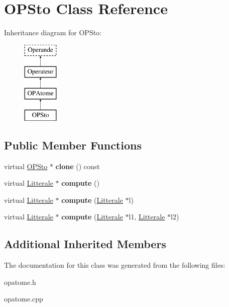 \hypertarget{class_o_p_sto}{}\section{O\+P\+Sto Class Reference}
\label{class_o_p_sto}
Inheritance diagram for O\+P\+Sto\+:\begin{figure}[H]
\begin{center}
\leavevmode
\includegraphics[height=4.000000cm]{class_o_p_sto}
\end{center}
\end{figure}
\subsection*{Public Member Functions}
\begin{DoxyCompactItemize}
\item 
virtual \hyperlink{class_o_p_sto}{O\+P\+Sto} $\ast$ {\bfseries clone} () const \hypertarget{class_o_p_sto_af06eca95a7efdb74a9e63491da02067f}{}\label{class_o_p_sto_af06eca95a7efdb74a9e63491da02067f}

\item 
virtual \hyperlink{class_litterale}{Litterale} $\ast$ {\bfseries compute} ()\hypertarget{class_o_p_sto_a1334907b87e8626bc830210fd13b959a}{}\label{class_o_p_sto_a1334907b87e8626bc830210fd13b959a}

\item 
virtual \hyperlink{class_litterale}{Litterale} $\ast$ {\bfseries compute} (\hyperlink{class_litterale}{Litterale} $\ast$l)\hypertarget{class_o_p_sto_aebe8dc34d4a4f3cd7a434a4e2314b5ef}{}\label{class_o_p_sto_aebe8dc34d4a4f3cd7a434a4e2314b5ef}

\item 
virtual \hyperlink{class_litterale}{Litterale} $\ast$ {\bfseries compute} (\hyperlink{class_litterale}{Litterale} $\ast$l1, \hyperlink{class_litterale}{Litterale} $\ast$l2)\hypertarget{class_o_p_sto_a28753ee9a6e433f477ec3197feccafdd}{}\label{class_o_p_sto_a28753ee9a6e433f477ec3197feccafdd}

\end{DoxyCompactItemize}
\subsection*{Additional Inherited Members}


The documentation for this class was generated from the following files\+:\begin{DoxyCompactItemize}
\item 
opatome.\+h\item 
opatome.\+cpp\end{DoxyCompactItemize}
